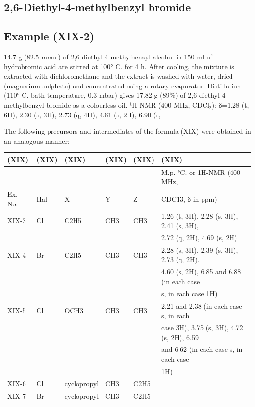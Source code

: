 \documentclass[11pt,a4paper]{article}
\begin{document}
\subsection{2,6-Diethyl-4-methylbenzyl bromide}

\subsection{Example (XIX-2)}

14.7 g (82.5 mmol) of 2,6-diethyl-4-methylbenzyl alcohol in 150 ml of hydrobromic acid are stirred at 100° C. for 4 h. After cooling, the mixture is extracted with dichloromethane and the extract is washed with water, dried (magnesium sulphate) and concentrated using a rotary evaporator. Distillation (110° C. bath temperature, 0.3 mbar) gives 17.82 g (89\%) of 2,6-diethyl-4-methylbenzyl bromide as a colourless oil. ¹H-NMR (400 MHz, CDCl₃): δ=1.28 (t, 6H), 2.30 (s, 3H), 2.73 (q, 4H), 4.61 (s, 2H), 6.90 (s,

The following precursors and intermediates of the formula (XIX) were obtained in an analogous manner:

\begin{table}[h]
\begin{tabular}{|l|l|l|l|l|l|}
\hline
(XIX) & (XIX) & (XIX) & (XIX) & (XIX) & (XIX) \\ \hline
 &  &  &  &  & M.p. °C. or 1H-NMR (400 MHz, \\ \hline
Ex. No. & Hal & X & Y & Z & CDC13, δ in ppm) \\ \hline
XIX-3 & Cl & C2H5 & CH3 & CH3 & 1.26 (t, 3H), 2.28 (s, 3H), 2.41 (s, 3H), \\ \hline
 &  &  &  &  & 2.72 (q, 2H), 4.69 (s, 2H) \\ \hline
XIX-4 & Br & C2H5 & CH3 & CH3 & 2.28 (s, 3H), 2.39 (s, 3H), 2.73 (q, 2H), \\ \hline
 &  &  &  &  & 4.60 (s, 2H), 6.85 and 6.88 (in each case \\ \hline
 &  &  &  &  & s, in each case 1H) \\ \hline
XIX-5 & Cl & OCH3 & CH3 & CH3 & 2.21 and 2.38 (in each case s, in each \\ \hline
 &  &  &  &  & case 3H), 3.75 (s, 3H), 4.72 (s, 2H), 6.59 \\ \hline
 &  &  &  &  & and 6.62 (in each case s, in each case \\ \hline
 &  &  &  &  & 1H) \\ \hline
XIX-6 & Cl & cyclopropyl & CH3 & C2H5 &  \\ \hline
XIX-7 & Br & cyclopropyl & CH3 & C2H5 &  \\ \hline
\end{tabular}
\end{table}
\end{document}
